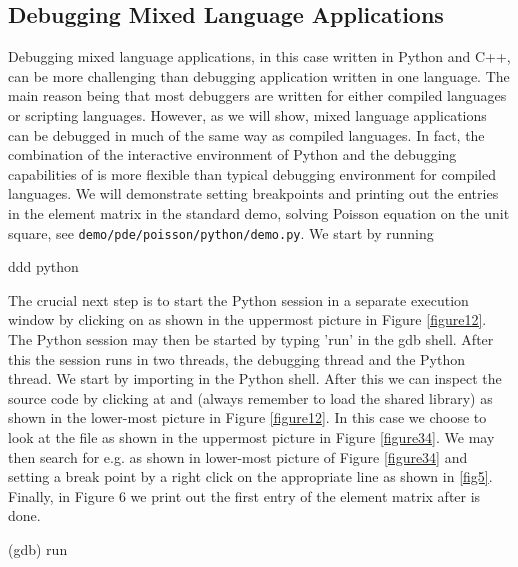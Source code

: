 \begin{code}
\section{Debugging Mixed Language Applications}
Debugging mixed language applications, in this case written in 
Python and C++, can be more challenging than debugging application
written in one language. The main reason being that most debuggers are written
for either compiled languages or scripting languages. However, as 
we will show, mixed language applications can be debugged in much of the same way 
as compiled languages. In fact, the combination of the interactive environment
of Python and the debugging capabilities of  is more flexible than typical
debugging environment for compiled languages. We will demonstrate setting breakpoints and
printing out the entries in the element matrix in the standard \dolfin demo, 
solving Poisson equation on the unit square, see \texttt{demo/pde/}\texttt{poisson/python/}\texttt{demo.py}. We start by running
\begin{code}
ddd python
\end{code}
The crucial next step is to start the Python session in a separate execution window by clicking on  as shown in the uppermost picture in  Figure \ref{figure12}. 
The Python session may then be started by typing 'run' in the gdb shell. 
After this the session runs in two threads, the debugging thread and the
Python thread. We start by importing \dolfin in the Python shell. After this we can inspect the \dolfin source code by clicking at  and  (always remember to load the shared library) as shown in the lower-most picture in Figure \ref{figure12}. In this case we choose to look at the file  as shown in the uppermost picture in Figure \ref{figure34}. We may then search for e.g.  as shown in lower-most picture of Figure \ref{figure34} and 
setting a break point by a right click on the appropriate line as shown in \ref{fig5}. Finally, in Figure 6 
we print out the first entry of the element matrix after  is done.
\begin{code}
(gdb) run
\end{code}
\begin{figure}[htbp]
   \\

\end{figure}
\end{code}
